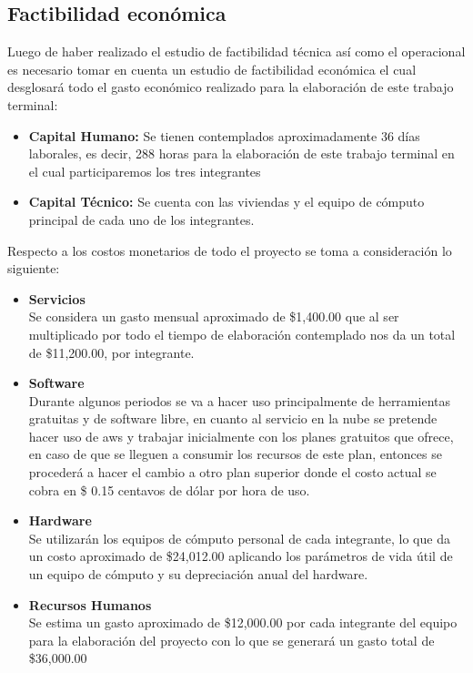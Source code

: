 \documentclass[12pt, a4paper, titlepage]{report}
\begin{document}
    	\subsection{Factibilidad económica\label{FactibilidadEconomica}}
    	Luego de haber realizado el estudio de factibilidad técnica así como el operacional es necesario tomar en cuenta un estudio de factibilidad económica el cual desglosará todo el gasto económico realizado para la elaboración de este trabajo terminal:
    	\begin{itemize}
    		\item \textbf{Capital Humano:} Se tienen contemplados aproximadamente 36 días laborales, es decir, 288 horas para la elaboración de este trabajo terminal en el cual participaremos los tres integrantes
    		\item \textbf{Capital Técnico:} Se cuenta con las viviendas y el equipo de cómputo principal de cada uno de los integrantes.
    	\end{itemize}
    	Respecto a los costos monetarios de todo el proyecto se toma a consideración lo siguiente:
    	\begin{itemize}
    		\item \textbf{Servicios}\\
    		Se considera un gasto mensual aproximado de \$1,400.00 que al ser multiplicado por todo el tiempo de elaboración contemplado nos da un total de \$11,200.00, por integrante.
    		\item \textbf{Software} \\
    		Durante algunos periodos se va a hacer uso principalmente de herramientas gratuitas y de software libre, en cuanto al servicio en la nube se pretende hacer uso de \acrshort{aws} y trabajar inicialmente con los planes gratuitos que ofrece, en caso de que se lleguen a consumir los recursos de este plan, entonces se procederá a hacer el cambio a otro plan superior donde el costo actual se cobra en \$ 0.15 centavos de dólar por hora de uso.
    		\item \textbf{Hardware}\\
    		Se utilizarán los equipos de cómputo personal de cada integrante, lo que da un costo aproximado de \$24,012.00 aplicando los parámetros de vida útil de un equipo de cómputo y su depreciación anual del hardware. 
    		\item \textbf{Recursos Humanos}\\
    		Se estima un gasto aproximado de \$12,000.00 por cada integrante del equipo para la elaboración del proyecto con lo que se generará un gasto total de \$36,000.00
    	\end{itemize}
\end{document}
